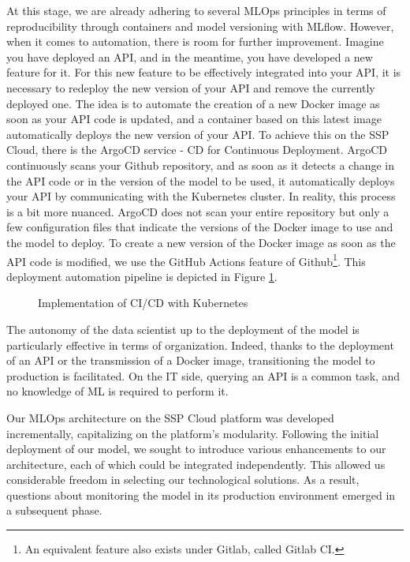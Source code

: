 At this stage, we are already adhering to several MLOps principles in terms of reproducibility through containers and model versioning with MLflow. However, when it comes to automation, there is room for further improvement. Imagine you have deployed an API, and in the meantime, you have developed a new feature for it. For this new feature to be effectively integrated into your API, it is necessary to redeploy the new version of your API and remove the currently deployed one. The idea is to automate the creation of a new Docker image as soon as your API code is updated, and a container based on this latest image automatically deploys the new version of your API. To achieve this on the SSP Cloud, there is the ArgoCD service - CD for Continuous Deployment. ArgoCD continuously scans your Github repository, and as soon as it detects a change in the API code or in the version of the model to be used, it automatically deploys your API by communicating with the Kubernetes cluster. In reality, this process is a bit more nuanced. ArgoCD does not scan your entire repository but only a few configuration files that indicate the versions of the Docker image to use and the model to deploy. To create a new version of the Docker image as soon as the API code is modified, we use the GitHub Actions feature of Github\footnote{An equivalent feature also exists under Gitlab, called Gitlab CI.}. This deployment automation pipeline is depicted in Figure \ref{fig:ci-cd}.

\begin{figure}[htbp]
    \centering
    \caption{Implementation of CI/CD with Kubernetes}
    \label{fig:ci-cd}
\end{figure}

The autonomy of the data scientist up to the deployment of the model is particularly effective in terms of organization. Indeed, thanks to the deployment of an API or the transmission of a Docker image, transitioning the model to production is facilitated. On the IT side, querying an API is a common task, and no knowledge of ML is required to perform it.

Our MLOps architecture on the SSP Cloud platform was developed incrementally, capitalizing on the platform's modularity. Following the initial deployment of our model, we sought to introduce various enhancements to our architecture, each of which could be integrated independently. This allowed us considerable freedom in selecting our technological solutions. As a result, questions about monitoring the model in its production environment emerged in a subsequent phase.

